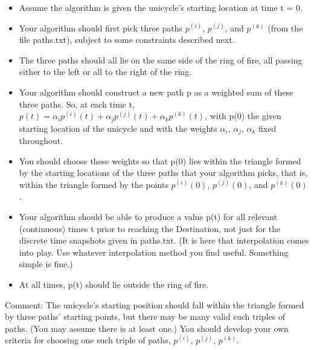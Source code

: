 \documentclass[conference,onecolumn]{IEEEtran}
\begin{document}
\begin{enumerate}[label=\arabic{enumi}.]
\begin{enumerate}
                    \begin{itemize}
                        \item Assume the algorithm is given the unicycle's starting location at time t = 0.
                        \item Your algorithm should first pick three paths $p^{(i)}$, $p^{(j)}$, and $p^{(k)}$ (from the file paths.txt), subject to some constraints described next.
                        \item The three paths should all lie on the same side of the ring of fire, all passing either to the left or all to the right of the ring.
                        \item Your algorithm should construct a new path p as a weighted sum of these three paths.
                              So, at each time t, $p(t) = \alpha_i p^{(i)}(t) + \alpha_j p^{(j)}(t) + \alpha_k p^{(k)}(t)$, with p(0) the given starting location of the unicycle and with the weights $\alpha_i$, $\alpha_j$, $\alpha_k$ fixed throughout.
                        \item You should choose these weights so that p(0) lies within the triangle formed by the starting locations of the three paths that your algorithm picks, that is, within the triangle formed by the points $p^{(i)}(0)$, $p^{(j)}(0)$, and $p^{(k)}(0)$.
                        \item Your algorithm should be able to produce a value p(t) for all relevant (continuous) times t prior to reaching the Destination, not just for the discrete time snapshots given in paths.txt.
                              (It is here that interpolation comes into play.
                              Use whatever interpolation method you ﬁnd useful.
                              Something simple is fine.)
                        \item At all times, p(t) should lie outside the ring of fire.
                    \end{itemize}

                    Comment: The unicycle's starting position should fall within the triangle formed by three paths' starting points, but there may be many valid such triples of paths.
                    (You may assume there is at least one.)
                    You should develop your own criteria for choosing one such triple of paths, $p^{(i)}$, $p^{(j)}$, $p^{(k)}$.


\end{enumerate}
\end{enumerate}
\end{document}

